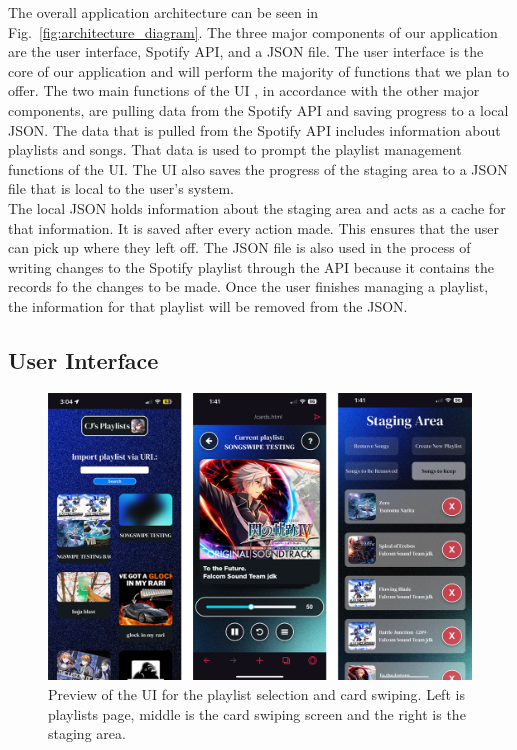 \documentclass{article}
\begin{document}
\quad The overall application architecture can be seen in Fig.~\ref{fig:architecture_diagram}. The three major components of our application are the user interface, Spotify API, and a JSON file. The user interface is the core of our application and will perform the majority of functions that we plan to offer. The two main functions of the UI , in accordance with the other major components, are pulling data from the Spotify API and saving progress to a local JSON. The data that is pulled from the Spotify API includes information about playlists and songs. That data is used to prompt the playlist management functions of the UI. The UI also saves the progress of the staging area to a JSON file that is local to the user’s system.\\

\quad The local JSON holds information about the staging area and acts as a cache for that information. It is saved after every action made. This ensures that the user can pick up where they left off. The JSON file is also used in the process of writing changes to the Spotify playlist through the API because it contains the records fo the changes to be made. Once the user finishes managing a playlist, the information for that playlist will be removed from the JSON.

\subsection{User Interface}
\begin{figure}[ht]
  \centering
  \captionsetup{justification=centering}
  \includegraphics[width=6in,scale=5]{./ui-final.png}
  \caption{Preview of the UI for the playlist selection and card swiping. Left is playlists page, middle is the card swiping screen and the right is the staging area. }
  \label{fig:ui_preview}
\end{figure}
\end{document}
